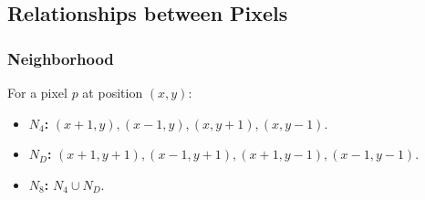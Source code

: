 \subsection*{Relationships between Pixels}

\subsubsection*{Neighborhood}

For a pixel $p$ at position $(x, y)$:

\begin{itemize}
  \item \textbf{$N_4$:} $(x + 1, y), (x - 1, y), (x, y + 1), (x, y - 1)$.
  \item \textbf{$N_D$:} $(x + 1, y + 1), (x - 1, y + 1), (x + 1, y - 1), (x - 1, y - 1)$.
  \item \textbf{$N_8$:} $N_4 \cup N_D$.
  
\end{itemize}

